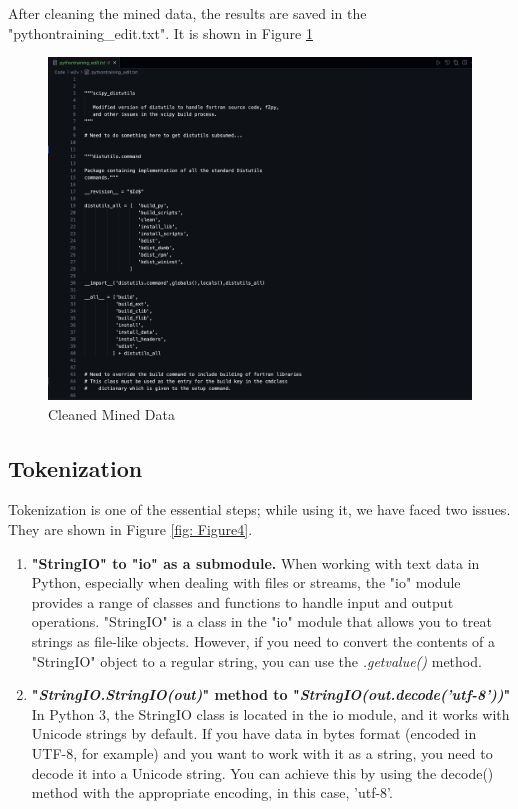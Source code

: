 After cleaning the mined data, the results are saved in the "pythontraining\_edit.txt". It is shown in Figure \ref{fig: Figure3}
\begin{figure}[!ht]
    \centering
    \includegraphics[width=1\linewidth]{pictures/cleaned_data.png}
    \caption{Cleaned Mined Data}
    \label{fig: Figure3}
\end{figure}

\subsection{\textbf{Tokenization}}
Tokenization is one of the essential steps; while using it, we have faced two issues. They are shown in Figure \ref{fig: Figure4}. 
\begin{enumerate}
    \item \textbf{"StringIO" to "io" as a submodule. }\newline When working with text data in Python, especially when dealing with files or streams, the "io" module provides a range of classes and functions to handle input and output operations. "StringIO" is a class in the "io" module that allows you to treat strings as file-like objects. However, if you need to convert the contents of a "StringIO" object to a regular string, you can use the \textit{.getvalue()} method.
    \item \textbf{"\textit{StringIO.StringIO(out)}" method to "\textit{StringIO(out.decode('utf-8'))}"} \newline In Python 3, the StringIO class is located in the io module, and it works with Unicode strings by default. If you have data in bytes format (encoded in UTF-8, for example) and you want to work with it as a string, you need to decode it into a Unicode string. You can achieve this by using the decode() method with the appropriate encoding, in this case, 'utf-8'.
\end{enumerate}

